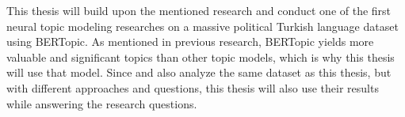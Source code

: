 This thesis will build upon the mentioned research and conduct one of the first 
neural topic modeling researches on a massive political Turkish language dataset using BERTopic. 
As mentioned in previous research, BERTopic yields more valuable and significant topics than 
other topic models, which is why this thesis will use that model.
Since \textcite{turkishbertweet_2023} and also \textcite{secim2023} analyze the same dataset 
as this thesis, but with different approaches and questions, this thesis will also use their 
results while answering the research questions.


